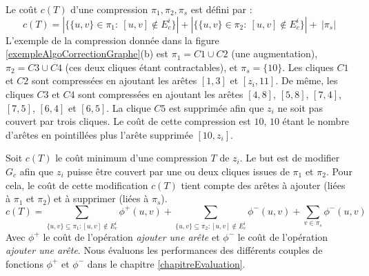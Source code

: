 Le co\^ut $c(T)$ d'une compression $\pi_{1},\pi_{2},\pi_{s}$ est d\'efini par : 
$$c(T) = | \{\{u,v\} \in \pi_{1}:~[u,v]\not\in E_{c}^{i}\}| + |\{\{u,v\} \in \pi_2:~[u,v]\not\in E_{c}^{i}\}| +~ |\pi_s| $$
L'exemple de la compression donn\'ee dans la figure \ref{exempleAlgoCorrectionGraphe}(b) est $\pi_1 = C1 \cup C2$ (une augmentation), $\pi_2 = C3 \cup C4$ (ces deux cliques \'etant contractables), et $\pi_s = \{10\}$.
Les cliques $C1$ et $C2$ sont compress\'ees en ajoutant les ar\^etes $[1,3]$ et $[z_i,11]$. De m\^eme, les cliques $C3$ et $C4$ sont compress\'ees en ajoutant les ar\^etes  $[4,8]$, $[5,8]$, $[7,4]$, $[7,5]$, $[6,4]$ et $[6,5]$. La clique $C5$ est supprim\'ee afin que $z_i$ ne soit pas couvert par trois cliques.
Le co\^ut  de cette compression est $10$, $10$ \'etant le nombre d'ar\^etes en pointill\'ees plus l'ar\^ete supprim\'ee $[10,z_i]$.
\newline

Soit  $c(T)$ le co\^ut minimum d'une compression $T$ de $z_i$.
Le but est de modifier $G_c$ afin que $z_i$ puisse \^etre couvert par une ou deux cliques issues de $\pi_1$ et $\pi_2$.
Pour cela, le co\^ut de cette modification $c(T)$ tient compte des ar\^etes \`a ajouter (li\'ees \`a $\pi_1$ et $\pi_2$) et \`a supprimer (li\'ees \`a $\pi_s$).
\begin{equation}
c(T) = \sum_{ \{u,v\} \subseteq \pi_1: [u,v] \notin E_c^i } \phi^{+}(u,v) + \sum_{ \{u,v\} \subseteq \pi_2: [u,v] \notin E_c^i } \phi^{-}(u,v) + \sum_{ v \in \pi_s } \phi^{-}(u,v)
\end{equation}
Avec $\phi^{+}$ le co\^ut de l'op\'eration {\em ajouter une ar\^ete} et  
$\phi^{-}$ le co\^ut de l'op\'eration {\em ajouter une ar\^ete}.
\newline
Nous \'evaluons les performances des diff\'erents couples de fonctions $\phi^{+}$ et $\phi^{-}$ dans le chapitre \ref{chapitreEvaluation}.
\newline

